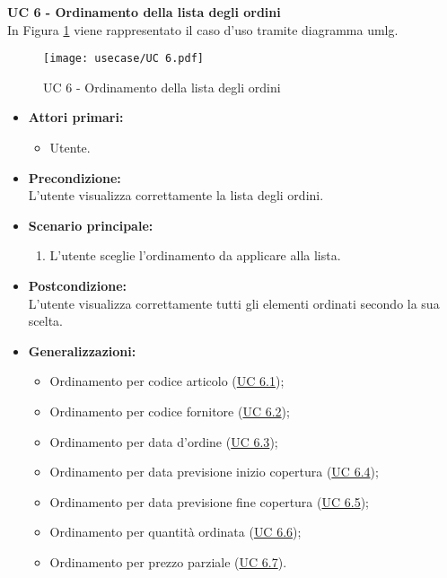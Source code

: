 \vspace{0.4cm}

\newpage

\noindent \textbf{\large UC 6 - Ordinamento della lista degli ordini}\\[0.2cm]
\label{uc:ordinamento-elementi-lista}
\noindent In Figura \ref{use-case-6} viene rappresentato il caso d'uso tramite diagramma \gls{umlg}.
\begin{figure}[!h] 
    \centering 
    \texttt{[image: usecase/UC 6.pdf]} 
    \caption{UC 6 - Ordinamento della lista degli ordini}
	\label{use-case-6}
\end{figure}
\begin{itemize}

	\item \textbf{Attori primari: }
		\begin{itemize}
			\item Utente.
		\end{itemize}

	\item \textbf{Precondizione: }\\[0.3cm]
		L'utente visualizza correttamente la lista degli ordini.

	\item \textbf{Scenario principale: }
		\begin{enumerate}
			\item L'utente sceglie l'ordinamento da applicare alla lista.
		\end{enumerate}
		

	\item \textbf{Postcondizione: }\\[0.3cm]
		L'utente visualizza correttamente tutti gli elementi ordinati secondo la sua scelta.
    
    \item \textbf{Generalizzazioni: }
        \begin{itemize}
            \item Ordinamento per codice articolo (\hyperref[uc:ordinamento-codice-articolo]{UC 6.1});
            \item Ordinamento per codice fornitore (\hyperref[uc:ordinamento-codice-fornitore]{UC 6.2});
            \item Ordinamento per data d'ordine (\hyperref[uc:ordinamento-data-ordine]{UC 6.3});
            \item Ordinamento per data previsione inizio copertura (\hyperref[uc:ordinamento-data-iniziale-copertura]{UC 6.4});
            \item Ordinamento per data previsione fine copertura (\hyperref[uc:ordinamento-data-finale-copertura]{UC 6.5});
            \item Ordinamento per quantità ordinata (\hyperref[uc:ordinamento-quantita-ordinata]{UC 6.6});
            \item Ordinamento per prezzo parziale (\hyperref[uc:ordinamento-prezzo-parziale-ord]{UC 6.7}).
        \end{itemize}
\end{itemize}

